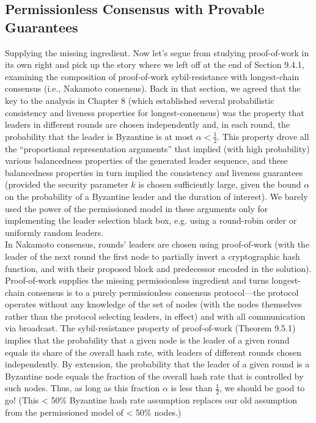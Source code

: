 \subsection{Permissionless Consensus with Provable Guarantees}
Supplying the missing ingredient. Now let’s segue from studying proof-of-work in its
own right and pick up the story where we left off at the end of Section 9.4.1, examining the
composition of proof-of-work sybil-resistance with longest-chain consensus (i.e., Nakamoto
consensus). Back in that section, we agreed that the key to the analysis in Chapter 8 (which
established several probabilistic consistency and liveness properties for longest-consensus)
was the property that leaders in different rounds are chosen independently and, in each
round, the probability that the leader is Byzantine is at most $\alpha < \frac{1}{2}$. This property drove
all the “proportional representation arguments” that implied (with high probability) various
balancedness properties of the generated leader sequence, and these balancedness properties
in turn implied the consistency and liveness guarantees (provided the security parameter $k$
is chosen sufficiently large, given the bound $\alpha$ on the probability of a Byzantine leader and
the duration of interest). We barely used the power of the permissioned model in these
arguments only for implementing the leader selection black box, e.g. using a round-robin
order or uniformly random leaders.\\
In Nakamoto consensus, rounds’ leaders are chosen using proof-of-work (with the leader
of the next round the first node to partially invert a cryptographic hash function, and with
their proposed block and predecessor encoded in the solution). Proof-of-work supplies the
missing permissionless ingredient and turns longest-chain consensus is to a purely permissionless consensus protocol—the protocol operates without any knowledge of the set of nodes (with the nodes themselves rather than the protocol selecting leaders, in effect) and with all
communication via broadcast. The sybil-resistance property of proof-of-work (Theorem 9.5.1)
implies that the probability that a given node is the leader of a given round equals its share
of the overall hash rate, with leaders of different rounds chosen independently. By extension,
the probability that the leader of a given round is a Byzantine node equals the fraction of
the overall hash rate that is controlled by such nodes. Thus, as long as this fraction $\alpha$ is less
than $\frac{1}{2}$, we should be good to go! (This < 50\% Byzantine hash rate assumption replaces our
old assumption from the permissioned model of < 50\% nodes.)\\

